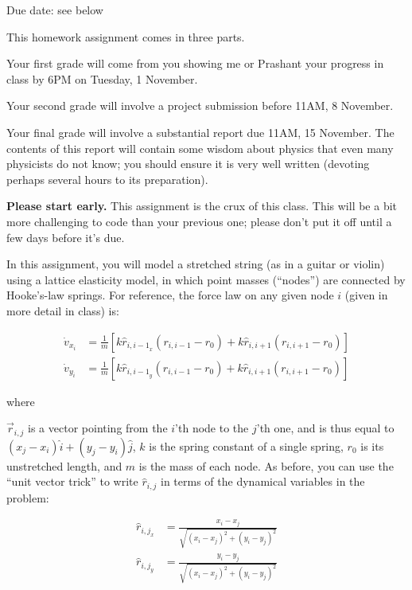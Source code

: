 \documentclass[12pt]{article}
\begin{document}
\Large
\centerline{}
\centerline{Due date: see below}
\normalsize

This homework assignment comes in three parts.

Your first grade will come from you showing me or Prashant your progress in class by 6PM on Tuesday, 1 November.

Your second grade will involve a project submission before 11AM, 8 November.

Your final grade will involve a substantial report due 11AM, 15 November. The contents of this report will contain some wisdom about physics that even many physicists
do not know; you should ensure it is very well written (devoting perhaps several hours to its preparation).

{\bf Please start early.} This assignment is the crux of this class.
This will be a bit more challenging to code than your previous one; please don't put it off until a few days before it's due.

In this assignment, you will model a stretched string (as in a guitar or violin) using a lattice elasticity model, in which point masses (``nodes'') are connected by Hooke's-law springs.
For reference, the force law on any given node $i$ (given in more detail in class) is:

\begin{align}
  \dot v_{x_i} &= \frac{1}{m} \left[ k \hat r_{{i,i-1}_x} (r_{i,i-1} - r_0) + k \hat r_{i,i+1} (r_{i,i+1} - r_0) \right] \\
  \dot v_{y_i} &= \frac{1}{m} \left[ k \hat r_{{i,i-1}_y} (r_{i,i-1} - r_0) + k \hat r_{i,i+1} (r_{i,i+1} - r_0) \right]
\end{align}

where

$\vec r_{i,j}$ is a vector pointing from the $i$'th node to the $j$'th one, and is thus equal to $(x_j-x_i)\hat i + (y_j-y_i)\hat j$, $k$ is the spring constant of a single spring, $r_0$ is its unstretched length, and $m$ is the mass of each node.
As before, you can use the ``unit vector trick'' to write $\hat r_{i,j}$ in terms of the dynamical variables in the problem:

\begin{align}
  \hat r_{{i,j}_x} &= \frac{x_i - x_j}{\sqrt{(x_i-x_j)^2 + (y_i-y_j)^2}}\\
  \hat r_{{i,j}_y} &= \frac{y_i - y_j}{\sqrt{(x_i-x_j)^2 + (y_i-y_j)^2}}
\end{align}
\end{document}
